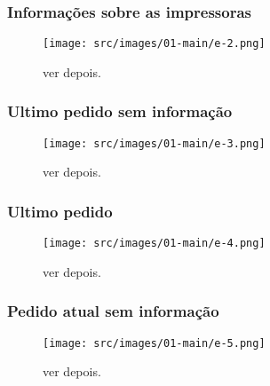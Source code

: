 \newpage
\thispagestyle{fancy}

\vspace*{\fill}

\subsubsection{\small{Informações sobre as impressoras}}


\begin{figure}[h]
  \centering
  \texttt{[image: src/images/01-main/e-2.png]}
  \caption{ver depois.}
   \label{}
\end{figure}

\vspace*{\fill}

\newpage
\thispagestyle{fancy}

\vspace*{\fill}

\subsubsection{\small{Ultimo pedido sem informação}}


\begin{figure}[h]
  \centering
  \texttt{[image: src/images/01-main/e-3.png]}
  \caption{ver depois.}
   \label{}
\end{figure}

\vspace*{\fill}



\newpage
\thispagestyle{fancy}

\vspace*{\fill}

\subsubsection{\small{Ultimo pedido}}


\begin{figure}[h]
  \centering
  \texttt{[image: src/images/01-main/e-4.png]}
  \caption{ver depois.}
   \label{}
\end{figure}

\vspace*{\fill}
\newpage
\thispagestyle{fancy}

\vspace*{\fill}

\subsubsection{\small{Pedido atual sem informação}}

\begin{figure}[h]
  \centering
  \texttt{[image: src/images/01-main/e-5.png]}
  \caption{ver depois.}
   \label{}
\end{figure}

\vspace*{\fill}